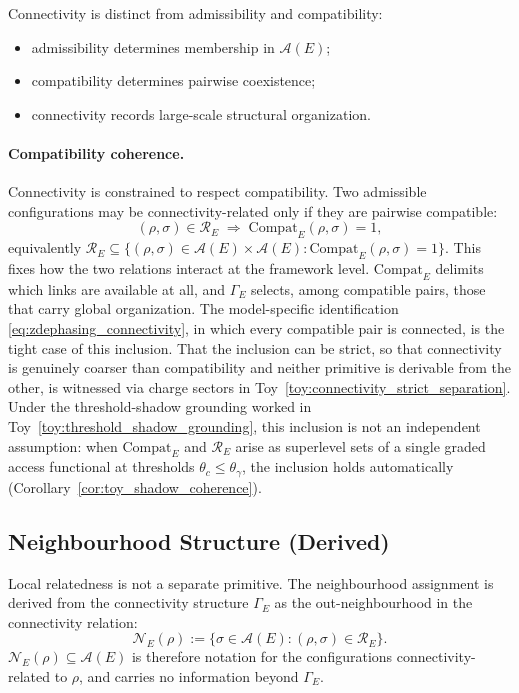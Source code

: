 \documentclass[aps,prx,onecolumn,11pt]{revtex4-2}
\theoremstyle{plain}
\theoremstyle{definition}
\theoremstyle{remark}
\begin{document}
Connectivity is distinct from admissibility and compatibility:
\begin{itemize}
\item admissibility determines membership in \(\mathcal{A}(E)\);
\item compatibility determines pairwise coexistence;
\item connectivity records large-scale structural organization.
\end{itemize}

\paragraph{Compatibility coherence.}
Connectivity is constrained to respect compatibility. Two admissible
configurations may be connectivity-related only if they are pairwise
compatible:
\[
(\rho,\sigma)\in\mathcal{R}_E
\;\Longrightarrow\;
\mathrm{Compat}_E(\rho,\sigma)=1,
\]
equivalently
\(\mathcal{R}_E \subseteq
\{(\rho,\sigma)\in\mathcal{A}(E)\times\mathcal{A}(E):
\mathrm{Compat}_E(\rho,\sigma)=1\}\).
This fixes how the two relations interact at the framework level.
\(\mathrm{Compat}_E\) delimits which links are available at all, and
\(\Gamma_E\) selects, among compatible pairs, those that carry global
organization. The model-specific identification
\eqref{eq:zdephasing_connectivity}, in which every compatible pair is
connected, is the tight case of this inclusion. That the inclusion can
be strict, so that connectivity is genuinely coarser than compatibility
and neither primitive is derivable from the other, is witnessed via
charge sectors in Toy~\ref{toy:connectivity_strict_separation}.
Under the threshold-shadow grounding worked in
Toy~\ref{toy:threshold_shadow_grounding}, this inclusion is not an
independent assumption: when \(\mathrm{Compat}_E\) and
\(\mathcal R_E\) arise as superlevel sets of a single graded access
functional at thresholds \(\theta_c\le\theta_\gamma\), the
inclusion holds automatically
(Corollary~\ref{cor:toy_shadow_coherence}).

\subsection{Neighbourhood Structure (Derived)}
\label{subsec:neighbourhood_structure}

Local relatedness is not a separate primitive. The neighbourhood
assignment is derived from the connectivity structure \(\Gamma_E\) as
the out-neighbourhood in the connectivity relation:
\[
\mathcal{N}_E(\rho)
:=
\{\sigma\in\mathcal{A}(E):(\rho,\sigma)\in\mathcal{R}_E\}.
\]
\(\mathcal{N}_E(\rho)\subseteq\mathcal{A}(E)\) is therefore notation
for the configurations connectivity-related to \(\rho\), and carries no
information beyond \(\Gamma_E\).
\end{document}
